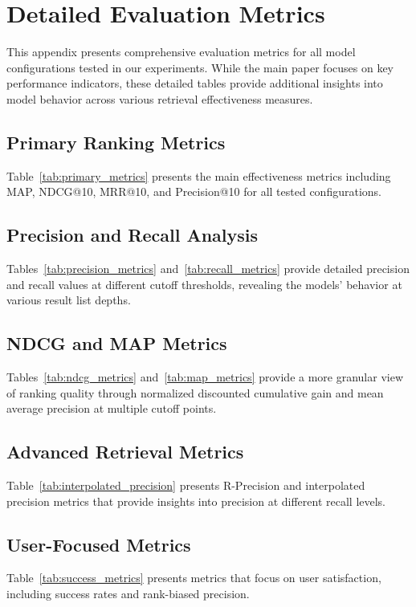 
\appendix

\section{Detailed Evaluation Metrics}
\label{app:metrics}

This appendix presents comprehensive evaluation metrics for all model configurations tested in our experiments. While the main paper focuses on key performance indicators, these detailed tables provide additional insights into model behavior across various retrieval effectiveness measures.

\subsection{Primary Ranking Metrics}
Table~\ref{tab:primary_metrics} presents the main effectiveness metrics including MAP, NDCG@10, MRR@10, and Precision@10 for all tested configurations.

\subsection{Precision and Recall Analysis}
Tables~\ref{tab:precision_metrics} and~\ref{tab:recall_metrics} provide detailed precision and recall values at different cutoff thresholds, revealing the models' behavior at various result list depths.

\subsection{NDCG and MAP Metrics}
Tables~\ref{tab:ndcg_metrics} and~\ref{tab:map_metrics} provide a more granular view of ranking quality through normalized discounted cumulative gain and mean average precision at multiple cutoff points.

\subsection{Advanced Retrieval Metrics}
Table~\ref{tab:interpolated_precision} presents R-Precision and interpolated precision metrics that provide insights into precision at different recall levels.

\subsection{User-Focused Metrics}
Table~\ref{tab:success_metrics} presents metrics that focus on user satisfaction, including success rates and rank-biased precision.

